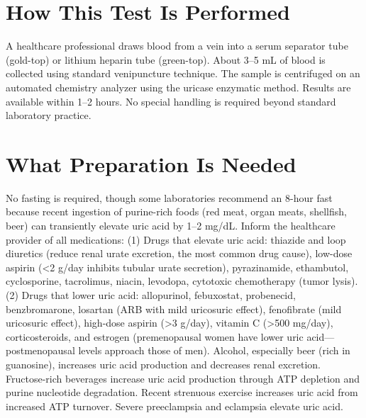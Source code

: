 \section*{How This Test Is Performed}
A healthcare professional draws blood from a vein into a serum separator tube (gold-top) or lithium heparin tube (green-top). About 3--5 mL of blood is collected using standard venipuncture technique. The sample is centrifuged on an automated chemistry analyzer using the uricase enzymatic method. Results are available within 1--2 hours. No special handling is required beyond standard laboratory practice.

\section*{What Preparation Is Needed}
No fasting is required, though some laboratories recommend an 8-hour fast because recent ingestion of purine-rich foods (red meat, organ meats, shellfish, beer) can transiently elevate uric acid by 1--2 mg/dL. Inform the healthcare provider of all medications: (1) Drugs that elevate uric acid: thiazide and loop diuretics (reduce renal urate excretion, the most common drug cause), low-dose aspirin (<2 g/day inhibits tubular urate secretion), pyrazinamide, ethambutol, cyclosporine, tacrolimus, niacin, levodopa, cytotoxic chemotherapy (tumor lysis). (2) Drugs that lower uric acid: allopurinol, febuxostat, probenecid, benzbromarone, losartan (ARB with mild uricosuric effect), fenofibrate (mild uricosuric effect), high-dose aspirin (>3 g/day), vitamin C (>500 mg/day), corticosteroids, and estrogen (premenopausal women have lower uric acid---postmenopausal levels approach those of men). Alcohol, especially beer (rich in guanosine), increases uric acid production and decreases renal excretion. Fructose-rich beverages increase uric acid production through ATP depletion and purine nucleotide degradation. Recent strenuous exercise increases uric acid from increased ATP turnover. Severe preeclampsia and eclampsia elevate uric acid.

